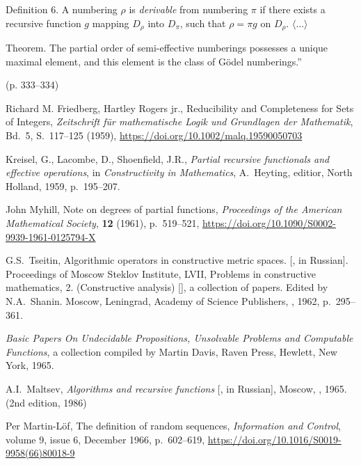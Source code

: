 \documentclass[12pt]{article}
\theoremstyle{remark}
\begin{document}
\begin{thebibliography}{99}
{{Definition 6. A numbering $\rho$ is \emph{derivable} from numbering $\pi$ if there exists a recursive function $g$ mapping $D_{\rho}$ into $D_{\pi}$, such that $\rho=\pi g$ on $D_{\rho}$.  $\langle \ldots\rangle$

Theorem. The partial order of semi-effective numberings possesses a unique maximal element, and this element is the class of G\"odel numberings.''

(p. 333--334)
}}

Richard M. Friedberg,  Hartley Rogers jr., Reducibility and Completeness for Sets of Integers, \emph{Zeitschrift f\"ur mathematische Logik und Grundlagen der Mathematik}, Bd.~5, S.~117--125 (1959), \url{https://doi.org/10.1002/malq.19590050703}

Kreisel, G., Lacombe, D., Shoenfield, J.R., 
\emph{Partial recursive functionals and effective operations}, in \emph{Constructivity in Mathematics}, A.~Heyting, editior, North Holland, 1959, p.~195--207.

 John Myhill, Note on degrees of partial functions, \emph{Proceedings of the American Mathematical Society}, \textbf{12} (1961), p.~519--521, \url{https://doi.org/10.1090/S0002-9939-1961-0125794-X }

G.S.~Tseitin, Algorithmic operators in constructive metric spaces. [, in Russian]. Proceedings of Moscow Steklov Institute, LVII, Problems in constructive mathematics, 2. (Constructive analysis) [], a collection of papers. Edited by N.A.~Shanin. Moscow, Leningrad, Academy of Science Publishers, , 1962, p.~295--361.

\emph{Basic Papers On Undecidable Propositions, Unsolvable Problems and Computable Functions}, a collection compiled by Martin Davis, Raven Press, Hewlett, New York, 1965.

A.I.~Maltsev, \emph{Algorithms and recursive functions} [, in Russian], Moscow, , 1965. (2nd edition, 1986)

Per Martin-L\"of, The definition of random sequences, \emph{Information and Control}, volume 9, issue 6, December 1966, p.~602--619, \url{https://doi.org/10.1016/S0019-9958(66)80018-9}


\end{thebibliography}
\end{document}
